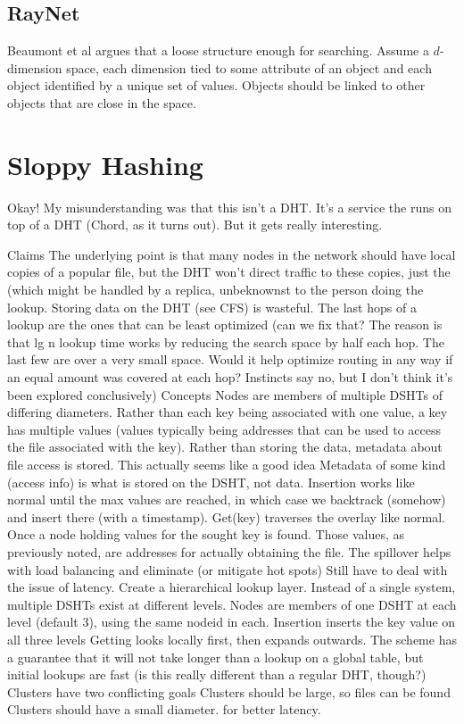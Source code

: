 \documentclass[10pt,letterpaper]{report}
\begin{document}
\subsection{RayNet}

Beaumont et al argues that a loose structure enough for searching.  Assume a $d$-dimension space, each dimension tied to some attribute of an object and each object identified by a unique set of values.  Objects should be linked to other objects that are close in the space.


\section{Sloppy Hashing}

Okay!  My misunderstanding was that this isn't a DHT.  It's a service the runs on top of a DHT (Chord, as it turns out).  But it gets really interesting.

Claims
The underlying point is  that many nodes in the network should have local copies of a popular file, but the DHT won't direct traffic to these copies, just the  (which  might be handled by a replica, unbeknownst to the person doing the lookup.
Storing data on the DHT (see CFS) is wasteful.
The last hops of a lookup are the ones that can be least optimized (can we fix that?  The reason is that lg n lookup time works by reducing the search space by half each hop.  The last few are over a very small space.  Would it help optimize routing in any way if an equal amount was covered at each hop?  Instincts say no, but I don't think it's been explored conclusively)
Concepts
Nodes are members of multiple DSHTs of differing diameters. 
Rather than each key being associated with one value, a key has multiple values (values typically being addresses that can be used to access the file associated with the key).  Rather than storing the data, metadata about file access is stored.  This actually seems like a good idea
Metadata of some kind (access info) is what is stored on the DSHT, not data.
Insertion works like normal until the max values are reached, in which  case we backtrack (somehow) and insert there (with a timestamp).
Get(key) traverses the overlay like normal.  Once a node holding values for the sought key is found.  Those values, as previously noted, are addresses for actually obtaining the file. 
The spillover helps with load balancing and eliminate (or mitigate hot spots)
Still have to deal with the issue of latency.  Create a hierarchical lookup layer.
Instead of a single system, multiple DSHTs exist at different levels.
Nodes are members of one  DSHT at each level (default 3), using the same nodeid in each.
Insertion inserts the key value on all three levels 
Getting looks locally first, then expands outwards.  The scheme has a guarantee that it will not take longer than a lookup on a  global table, but initial lookups are fast  (is this really different than a regular DHT, though?)
Clusters have two conflicting goals
Clusters should be large, so files can be found
Clusters should have a small diameter. for better latency.
\end{document}
